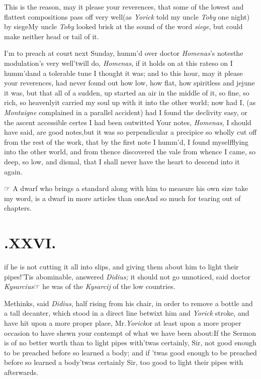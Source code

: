 \documentclass{article}
\begin{document}
\tsk This is the reason, may it please your reverences, that
some of the lowest and flattest compositions pass off
very\break
well\tsk (as \textit{Yorick} told my uncle \textit{Toby} one
night) by siege\tsk My uncle \textit{Toby} looked brisk at
the sound of the word \textit{siege}, but could make neither head or tail of
it.

I’m to preach at court next Sunday, 
humm’d over doctor \textit{Homenas}’s notes\tsk the
modulation’s very well\tsk ’twill do,
\textit{Homenas}, if it holds on at this rate\tsk so on I
humm’d\tsk and a tolerable tune I thought it was; and to
this hour, may it please your reverences, had never found
out how low, how flat, how spiritless and jejune it was, but
that all of a sudden, up started an air in the middle of it,
so fine, so rich, so heavenly\tsk it carried my soul up
with it into the other world; now had I, (as
\textit{Montaigne} complained in a parallel accident)\tsk
had I found the declivity easy, or the ascent accessible\tsk
certes I had been outwitted\break
\tsk Your notes, \textit{Homenas}, I should have said, are
good notes,\tsk but it was so per\-pendicular a precipice\tsk
so wholly cut off from the rest of the work, that by
the\break
first note I humm’d, I found myself\break flying into the other
world, and from thence discovered the vale from whence\break
I came, so deep, so low, and dismal,
that I shall never have
the heart to descend into it again.

☞ A dwarf who brings a standard\break
along with him to measure his own size\break
\tsk take my word, is a dwarf in more articles than
one\tsk And so much for tearing out of chapters.

\bigskip

\section{.\enspace XXVI.}

if he is not cutting it all into slips, and giving them
about him to light their pipes!\tsh ’Tis abominable,
answered \textit{Didius;} it should not go unnoticed, said
doctor \textit{Kysarcius}\tsh ☞  he was of the
\textit{Kysarcij} of the low countries.

Methinks, said \textit{Didius}, half rising\break
from his chair, in order to remove a
bottle and a tall decanter, which stood in a direct line
betwixt him and \textit{Yorick}\break
{}
stroke, and have hit upon a more proper
place, Mr.\@ \textit{Yorick}\tsk or at least upon a more
proper occasion to have shewn your contempt of what we have
been about:\break If the Sermon is of no better worth than to
light pipes with\tsk ’twas certainly, Sir, not good enough
to be preached before so learned a body; and if ’twas good
enough to be preached before so learned a body\tsk ’twas
certainly Sir, too good to light their pipes with
afterwards.
\end{document}
